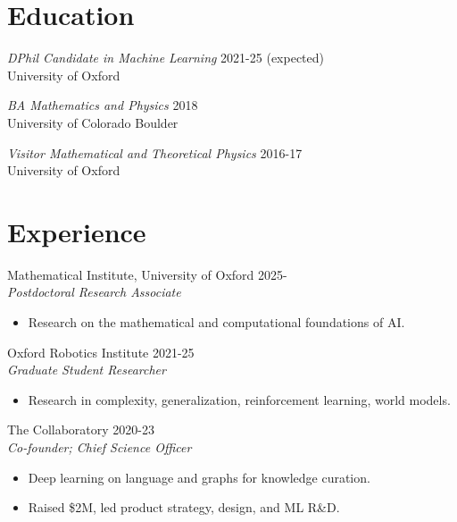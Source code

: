 \documentclass[margin]{res}
\begin{document}
\begin{resume}


    \section{Education} {\sl DPhil Candidate in Machine Learning} \hfill 2021-25 (expected)\\
                University of Oxford

  {\sl BA Mathematics and Physics} \hfill 2018\\
  University of Colorado Boulder

  {\sl Visitor Mathematical and Theoretical Physics} \hfill 2016-17\\
  University of Oxford

  \section{Experience}
  Mathematical Institute, University of Oxford \hfill 2025-\\
                 {\sl Postdoctoral Research Associate}
                 \begin{itemize}  \itemsep -2pt %
                 \item Research on the mathematical and computational foundations of AI.
                 \end{itemize}

  Oxford Robotics Institute \hfill 2021-25\\
                 {\sl Graduate Student Researcher}
                 \begin{itemize}  \itemsep -2pt %
                 \item Research in complexity, generalization, reinforcement learning, world models.
                 \end{itemize}

                The Collaboratory \hfill 2020-23 \\
                 {\sl Co-founder; Chief Science Officer}
                 \begin{itemize}  \itemsep -2pt %
                 \item Deep learning on language and graphs for knowledge curation.
                 \item Raised \$2M, led product strategy, design, and ML R\&D.
                 \end{itemize}


\end{resume}
\end{document}
